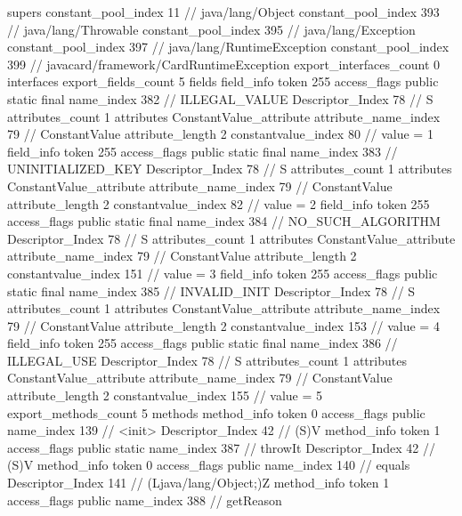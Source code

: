 {{{			supers {
				constant_pool_index	11		// java/lang/Object
				constant_pool_index	393		// java/lang/Throwable
				constant_pool_index	395		// java/lang/Exception
				constant_pool_index	397		// java/lang/RuntimeException
				constant_pool_index	399		// javacard/framework/CardRuntimeException
			}
			export_interfaces_count	0
			interfaces {
			}
			export_fields_count	5
			fields {
			field_info {
				token	255
				access_flags	public static final
				name_index	382		// ILLEGAL_VALUE
				Descriptor_Index	78		// S
				attributes_count	1
				attributes {
				ConstantValue_attribute {
					attribute_name_index	79		// ConstantValue
					attribute_length	2
					constantvalue_index	80		// value = 1
				}
				}
			}
			field_info {
				token	255
				access_flags	public static final
				name_index	383		// UNINITIALIZED_KEY
				Descriptor_Index	78		// S
				attributes_count	1
				attributes {
				ConstantValue_attribute {
					attribute_name_index	79		// ConstantValue
					attribute_length	2
					constantvalue_index	82		// value = 2
				}
				}
			}
			field_info {
				token	255
				access_flags	public static final
				name_index	384		// NO_SUCH_ALGORITHM
				Descriptor_Index	78		// S
				attributes_count	1
				attributes {
				ConstantValue_attribute {
					attribute_name_index	79		// ConstantValue
					attribute_length	2
					constantvalue_index	151		// value = 3
				}
				}
			}
			field_info {
				token	255
				access_flags	public static final
				name_index	385		// INVALID_INIT
				Descriptor_Index	78		// S
				attributes_count	1
				attributes {
				ConstantValue_attribute {
					attribute_name_index	79		// ConstantValue
					attribute_length	2
					constantvalue_index	153		// value = 4
				}
				}
			}
			field_info {
				token	255
				access_flags	public static final
				name_index	386		// ILLEGAL_USE
				Descriptor_Index	78		// S
				attributes_count	1
				attributes {
				ConstantValue_attribute {
					attribute_name_index	79		// ConstantValue
					attribute_length	2
					constantvalue_index	155		// value = 5
				}
				}
			}
			}
			export_methods_count	5
			methods {
				method_info {
					token	0
					access_flags	public
					name_index	139		// <init>
					Descriptor_Index	42		// (S)V
				}
				method_info {
					token	1
					access_flags	public static
					name_index	387		// throwIt
					Descriptor_Index	42		// (S)V
				}
				method_info {
					token	0
					access_flags	public
					name_index	140		// equals
					Descriptor_Index	141		// (Ljava/lang/Object;)Z
				}
				method_info {
					token	1
					access_flags	public
					name_index	388		// getReason
}}}}}
